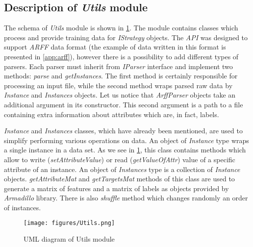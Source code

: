 \subsection{Description of \textit{Utils} module}

The schema of \textit{Utils} module is shown in \cref{fig:utils_sh}. The module contains classes which process and provide training data for \textit{IStrategy} objects. The \textit{API} was designed to support \textit{ARFF} data format (the example of data written in this format is presented in \cref{app:arff}), however there is a possibility to add different types of parsers. Each parser must inherit from \textit{IParser} interface and implement two methods: \textit{parse} and \textit{getInstances}. The first method is certainly responsible for processing an input file, while the second method wraps parsed raw data by \textit{Instance} and \textit{Instances} objects. Let us notice that \textit{ArffParser} objects take an additional argument in its constructor. This second argument is a path to a file containing extra information about attributes which are, in fact, labels.

\textit{Instance} and \textit{Instances} classes, which have already been mentioned, are used to simplify performing various operations on data. An object of \textit{Instance} type wraps a single instance in a data set. As we see in \cref{fig:utils_sh}, this class contains methods which allow to write (\textit{setAttributeValue}) or read (\textit{getValueOfAttr}) value of a specific attribute of an instance. An object of \textit{Instances} type is a collection of \textit{Instance} objects. \textit{getAttributeMat} and \textit{getTargetsMat} methods of this class are used to generate a matrix of features and a matrix of labels as objects provided by \textit{Armadillo} library. There is also \textit{shuffle} method which changes randomly an order of instances.  

\begin{figure}
\centering
\caption{UML diagram of Utils module}
\label{fig:utils_sh}
\texttt{[image: figures/Utils.png]}
\end{figure}

